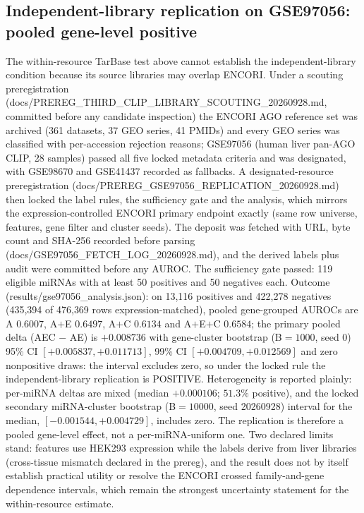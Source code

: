 \documentclass[11pt]{article}
\begin{document}
\subsection{Independent-library replication on GSE97056: pooled gene-level positive}
{\sloppy
The within-resource TarBase test above cannot establish the
independent-library condition because its source libraries may overlap
ENCORI. Under a scouting preregistration
(docs/PREREG\_THIRD\_CLIP\_LIBRARY\_SCOUTING\_20260928.md, committed before
any candidate inspection) the ENCORI AGO reference set was archived (361
datasets, 37 GEO series, 41 PMIDs) and every GEO series was classified with
per-accession rejection reasons; GSE97056 (human liver pan-AGO CLIP, 28
samples) passed all five locked metadata criteria and was designated, with
GSE98670 and GSE41437 recorded as fallbacks. A designated-resource
preregistration (docs/PREREG\_GSE97056\_REPLICATION\_20260928.md) then
locked the label rules, the sufficiency gate and the analysis, which
mirrors the expression-controlled ENCORI primary endpoint exactly (same row
universe, features, gene filter and cluster seeds). The deposit was fetched
with URL, byte count and SHA-256 recorded before parsing
(docs/GSE97056\_FETCH\_LOG\_20260928.md), and the derived labels plus audit
were committed before any AUROC. The sufficiency gate passed: 119 eligible
miRNAs with at least 50 positives and 50 negatives each. Outcome
(results/gse97056\_analysis.json): on 13{,}116 positives and 422{,}278
negatives (435{,}394 of 476{,}369 rows expression-matched), pooled
gene-grouped AUROCs are A $0.6007$, A$+$E $0.6497$, A$+$C $0.6134$ and
A$+$E$+$C $0.6584$; the primary pooled delta (AEC $-$ AE) is $+0.008736$
with gene-cluster bootstrap (B$=1000$, seed 0) 95\% CI
$[+0.005837,+0.011713]$, 99\% CI $[+0.004709,+0.012569]$ and zero
nonpositive draws: the interval excludes zero, so under the locked rule the
independent-library replication is POSITIVE. Heterogeneity is reported
plainly: per-miRNA deltas are mixed (median $+0.000106$; $51.3\%$
positive), and the locked secondary miRNA-cluster bootstrap (B$=10000$,
seed 20260928) interval for the median, $[-0.001544,+0.004729]$, includes
zero. The replication is therefore a pooled gene-level effect, not a
per-miRNA-uniform one. Two declared limits stand: features use HEK293
expression while the labels derive from liver libraries (cross-tissue
mismatch declared in the prereg), and the result does not by itself
establish practical utility or resolve the ENCORI crossed family-and-gene
dependence intervals, which remain the strongest uncertainty statement for
the within-resource estimate.
\par}
\end{document}
